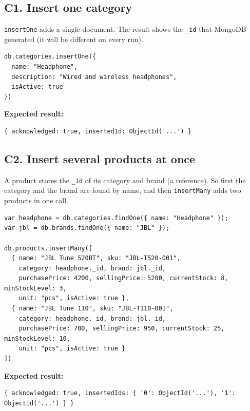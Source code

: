 \documentclass[11pt,a4paper]{article}
\newcommand{\code}[1]{\texttt{#1}}
\begin{document}
\subsection*{C1. Insert one category}
\code{insertOne} adds a single document. The result shows the \code{\_id} that MongoDB generated (it will be different on every run).

\begin{minipage}{\linewidth}
\begin{lstlisting}[style=query]
db.categories.insertOne({
  name: "Headphone",
  description: "Wired and wireless headphones",
  isActive: true
})
\end{lstlisting}
\end{minipage}

\noindent\textbf{Expected result:}
\begin{lstlisting}[style=result]
{ acknowledged: true, insertedId: ObjectId('...') }
\end{lstlisting}

\subsection*{C2. Insert several products at once}
A product stores the \code{\_id} of its category and brand (a reference). So first the category and the brand are found by name, and then \code{insertMany} adds two products in one call.

\begin{minipage}{\linewidth}
\begin{lstlisting}[style=query]
var headphone = db.categories.findOne({ name: "Headphone" });
var jbl = db.brands.findOne({ name: "JBL" });

db.products.insertMany([
  { name: "JBL Tune 520BT", sku: "JBL-T520-001",
    category: headphone._id, brand: jbl._id,
    purchasePrice: 4200, sellingPrice: 5200, currentStock: 8, minStockLevel: 3,
    unit: "pcs", isActive: true },
  { name: "JBL Tune 110", sku: "JBL-T110-001",
    category: headphone._id, brand: jbl._id,
    purchasePrice: 700, sellingPrice: 950, currentStock: 25, minStockLevel: 10,
    unit: "pcs", isActive: true }
])
\end{lstlisting}
\end{minipage}

\noindent\textbf{Expected result:}
\begin{lstlisting}[style=result]
{ acknowledged: true, insertedIds: { '0': ObjectId('...'), '1': ObjectId('...') } }
\end{lstlisting}
\end{document}
